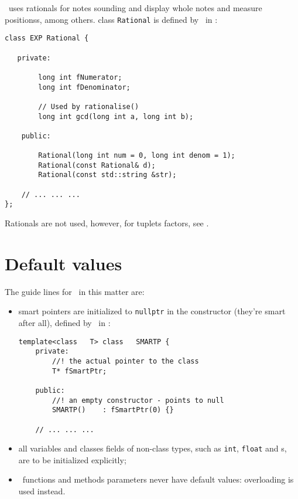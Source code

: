 \mf\ uses rationals for notes sounding and display whole notes and measure positionss, among others.
class   {\tt Rational} is defined by \libmusicxml\ in :
\begin{lstlisting}[language=CPlusPlus]
class EXP Rational {

   private:

        long int fNumerator;
        long int fDenominator;

        // Used by rationalise()
        long int gcd(long int a, long int b);

    public:

        Rational(long int num = 0, long int denom = 1);
        Rational(const Rational& d);
        Rational(const std::string &str);

	// ... ... ...
};
\end{lstlisting}

Rationals are not used, however, for tuplets factors, see .


\section{Default values}

The guide lines for \mf\ in this matter are:
\begin{itemize}
\item smart pointers are initialized to {\tt nullptr} in the  constructor (they're smart after all), defined by \libmusicxml\ in :
\begin{lstlisting}[language=CPlusPlus]
template<class   T> class   SMARTP {
	private:
		//! the actual pointer to the class
		T* fSmartPtr;

	public:
		//! an empty constructor - points to null
		SMARTP()	: fSmartPtr(0) {}

	// ... ... ...
\end{lstlisting}

\item all variables and classes fields of non-class   types, such as {\tt int}, {\tt float} and \enumType s, are to be initialized explicitly;

\item \mf\ functions and methods parameters never have default values: overloading is used instead.
\end{itemize}


